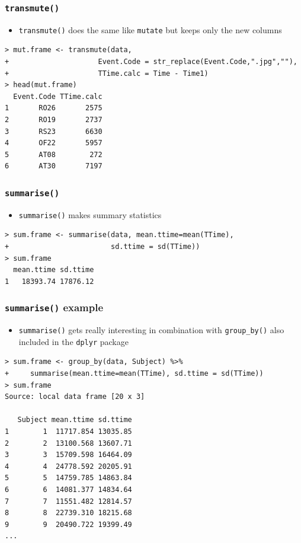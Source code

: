 \documentclass[xcolor={table},c]{beamer}
\begin{document}
\begin{frame}[fragile]\frametitle{\texttt{transmute()}}
  \begin{itemize}
  \item \texttt{transmute()} does the same like \texttt{mutate{}} but keeps only the new columns
  \end{itemize}\footnotesize
\begin{verbatim}
> mut.frame <- transmute(data,
+                     Event.Code = str_replace(Event.Code,".jpg",""),
+                     TTime.calc = Time - Time1)
> head(mut.frame)
  Event.Code TTime.calc
1       RO26       2575
2       RO19       2737
3       RS23       6630
4       OF22       5957
5       AT08        272
6       AT30       7197
\end{verbatim}
\end{frame}

\begin{frame}[fragile]\frametitle{\texttt{summarise()}}
  \begin{itemize}
  \item \texttt{summarise()} makes summary statistics
  \end{itemize}
\begin{verbatim}
> sum.frame <- summarise(data, mean.ttime=mean(TTime), 
+                        sd.ttime = sd(TTime))
> sum.frame
  mean.ttime sd.ttime
1   18393.74 17876.12  
\end{verbatim}
\end{frame}


\begin{frame}[fragile]\frametitle{\texttt{summarise()} example}
  \begin{itemize}
  \item \texttt{summarise()} gets really interesting in combination with \texttt{group\_by()} also included in the \texttt{dplyr} package
  \end{itemize}\footnotesize
\begin{verbatim}
> sum.frame <- group_by(data, Subject) %>%
+     summarise(mean.ttime=mean(TTime), sd.ttime = sd(TTime))
> sum.frame
Source: local data frame [20 x 3]

   Subject mean.ttime sd.ttime
1        1  11717.854 13035.85
2        2  13100.568 13607.71
3        3  15709.598 16464.09
4        4  24778.592 20205.91
5        5  14759.785 14863.84
6        6  14081.377 14834.64
7        7  11551.482 12814.57
8        8  22739.310 18215.68
9        9  20490.722 19399.49
...
\end{verbatim}
\end{frame}
\end{document}

